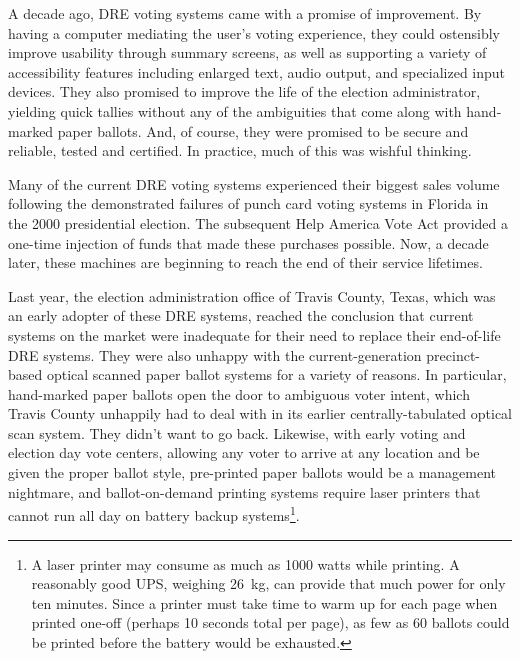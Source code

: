 ﻿\label{sec:intro}

A decade ago, DRE voting systems came with a promise of improvement. By having a
computer mediating the user's voting experience, they could ostensibly
improve usability through summary screens, as well as supporting a
variety of accessibility features including enlarged text, audio
output, and specialized input devices. They also promised to improve
the life of the election administrator, yielding quick tallies without
any of the ambiguities that come along with hand-marked paper ballots.
And, of course, they were promised to be secure and reliable, tested
and certified. In practice, much of this was wishful thinking.

Many of the current DRE voting systems experienced their biggest sales
volume following the demonstrated failures of punch card voting
systems in Florida in the 2000 presidential election. The subsequent Help America Vote Act
provided a one-time injection of funds that made these purchases
possible. Now, a decade later, these machines are beginning to reach the end of
their service lifetimes. 

Last year, the election administration office of Travis County, Texas, which was an
early adopter of these DRE systems, reached the conclusion that current
systems on the market were inadequate for their need to replace their
end-of-life DRE systems. They were also unhappy with the
current-generation precinct-based optical scanned paper ballot systems
for a variety of reasons. In particular, hand-marked paper ballots
open the door to ambiguous voter intent, which Travis County unhappily
had to deal with in its earlier centrally-tabulated optical scan
system. They didn't want to go back. Likewise, with early
voting and election day vote centers, allowing any voter to arrive at
any location and be given the proper ballot style, pre-printed paper ballots would
be a management nightmare, and ballot-on-demand printing systems
require laser printers that cannot run all day on battery backup
systems\footnote{A laser printer may consume as much as 1000 watts
  while printing. A reasonably good UPS, weighing 26~kg, can provide
  that much power for only ten minutes. Since a printer must take time
  to warm up for each page when printed one-off (perhaps 10
  seconds total per page), as few as 60 ballots could be printed before the
  battery would be exhausted.}.

